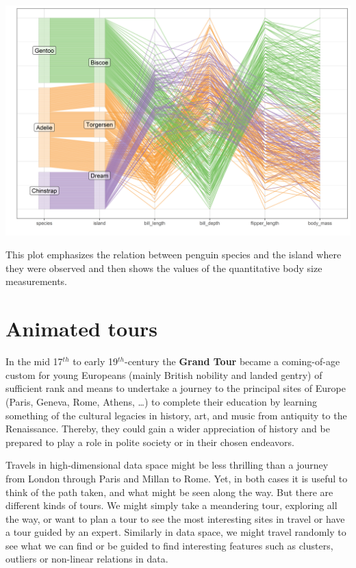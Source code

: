 \documentclass[
  letterpaper,
  10pt,
  krantz2]{krantz}
\begin{document}
{\begin{center}
\includegraphics[width=18in,height=\textheight]{figs/fig-peng-ggpcp2-1.png}
\end{center}

This plot emphasizes the relation between penguin species and the island
where they were observed and then shows the values of the quantitative
body size measurements.

\section{Animated tours}\label{animated-tours}

In the mid 17\(^{th}\) to early 19\(^{th}\)-century the \textbf{Grand
Tour} became a coming-of-age custom for young Europeans (mainly British
nobility and landed gentry) of sufficient rank and means to undertake a
journey to the principal sites of Europe (Paris, Geneva, Rome, Athens,
\ldots) to complete their education by learning something of the
cultural legacies in history, art, and music from antiquity to the
Renaissance. Thereby, they could gain a wider appreciation of history
and be prepared to play a role in polite society or in their chosen
endeavors.

Travels in high-dimensional data space might be less thrilling than a
journey from London through Paris and Millan to Rome. Yet, in both cases
it is useful to think of the path taken, and what might be seen along
the way. But there are different kinds of tours. We might simply take a
meandering tour, exploring all the way, or want to plan a tour to see
the most interesting sites in travel or have a tour guided by an expert.
Similarly in data space, we might travel randomly to see what we can
find or be guided to find interesting features such as clusters,
outliers or non-linear relations in data.

}
\end{document}
